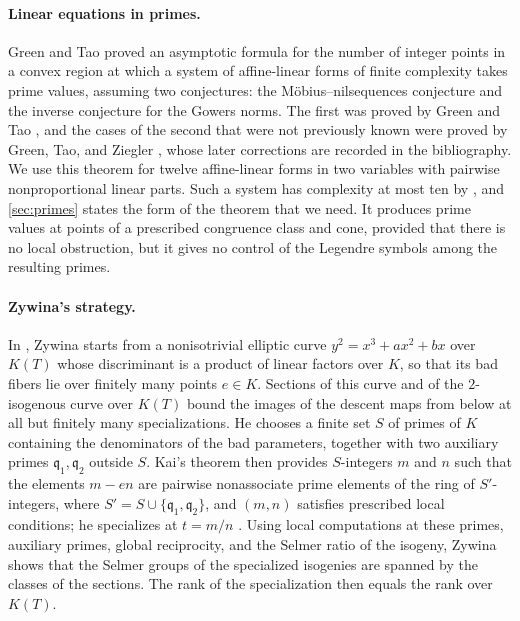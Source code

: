\documentclass[12pt,oneside,openany]{book}
\theoremstyle{definition}
\theoremstyle{plain}
\numberwithin{equation}{chapter}
\theoremstyle{plain}
\theoremstyle{definition}
\theoremstyle{remark}
\begin{document}
\paragraph{Linear equations in primes.} Green and Tao \cite{GT2010} proved an asymptotic formula for the number of integer points in a convex region at which a system of affine-linear forms of finite complexity takes prime values, assuming two conjectures: the M\"obius--nilsequences conjecture and the inverse conjecture for the Gowers norms. The first was proved by Green and Tao \cite[Theorem~1.1]{GT2012}, and the cases of the second that were not previously known were proved by Green, Tao, and Ziegler \cite[Theorem~1.3]{GTZ2012}, whose later corrections are recorded in the bibliography. We use this theorem for twelve affine-linear forms in two variables with pairwise nonproportional linear parts. Such a system has complexity at most ten by \cite[Lemma~1.6]{GT2010}, and \cref{sec:primes} states the form of the theorem that we need. It produces prime values at points of a prescribed congruence class and cone, provided that there is no local obstruction, but it gives no control of the Legendre symbols among the resulting primes.

\paragraph{Zywina's strategy.} In \cite{Zywina2026}, Zywina starts from a nonisotrivial elliptic curve $y^2=x^3+ax^2+bx$ over $K(T)$ whose discriminant is a product of linear factors over $K$, so that its bad fibers lie over finitely many points $e\in K$. Sections of this curve and of the $2$-isogenous curve over $K(T)$ bound the images of the descent maps from below at all but finitely many specializations. He chooses a finite set $S$ of primes of $K$ containing the denominators of the bad parameters, together with two auxiliary primes $\mathfrak q_1,\mathfrak q_2$ outside $S$. Kai's theorem \cite[Proposition~13.2]{Kai} then provides $S$-integers $m$ and $n$ such that the elements $m-en$ are pairwise nonassociate prime elements of the ring of $S'$-integers, where $S'=S\cup\{\mathfrak q_1,\mathfrak q_2\}$, and $(m,n)$ satisfies prescribed local conditions; he specializes at $t=m/n$ \cite[Proposition~5.9]{Zywina2026}. Using local computations at these primes, auxiliary primes, global reciprocity, and the Selmer ratio of the isogeny, Zywina shows that the Selmer groups of the specialized isogenies are spanned by the classes of the sections. The rank of the specialization then equals the rank over $K(T)$.
\end{document}
